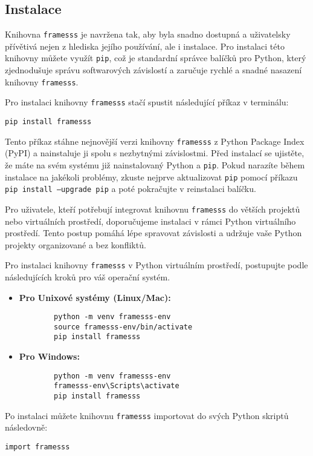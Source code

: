 \subsection{Instalace} \label{sec:framesss_instalation}

Knihovna \texttt{framesss} je navržena tak, aby byla snadno dostupná a uživatelsky přívětivá nejen z hlediska jejího používání, ale i instalace. Pro instalaci této knihovny můžete využít \texttt{pip}, což je standardní správce balíčků pro Python, který zjednodušuje správu softwarových závislostí a zaručuje rychlé a snadné nasazení knihovny \texttt{framesss}.

Pro instalaci knihovny \texttt{framesss} stačí spustit následující příkaz v terminálu:

\begin{verbatim}
pip install framesss
\end{verbatim}

Tento příkaz stáhne nejnovější verzi knihovny \texttt{framesss} z Python Package Index (PyPI) a nainstaluje ji spolu s nezbytnými závislostmi. Před instalací se ujistěte, že máte na svém systému již nainstalovaný Python a \texttt{pip}. Pokud narazíte během instalace na jakékoli problémy, zkuste nejprve aktualizovat \texttt{pip} pomocí příkazu \texttt{pip install --upgrade pip} a poté pokračujte v reinstalaci balíčku.

Pro uživatele, kteří potřebují integrovat knihovnu \texttt{framesss} do větších projektů nebo virtuálních prostředí, doporučujeme instalaci v rámci Python virtuálního prostředí. Tento postup pomáhá lépe spravovat závislosti a udržuje vaše Python projekty organizované a bez konfliktů.

Pro instalaci knihovny \texttt{framesss} v Python virtuálním prostředí, postupujte podle následujících kroků pro váš operační systém.


\begin{itemize}
    \item \textbf{Pro Unixové systémy (Linux/Mac):}
        \begin{verbatim}
        python -m venv framesss-env
        source framesss-env/bin/activate
        pip install framesss
        \end{verbatim}
    
    \item \textbf{Pro Windows:}
        \begin{verbatim}
        python -m venv framesss-env
        framesss-env\Scripts\activate
        pip install framesss
        \end{verbatim}
\end{itemize}

Po instalaci můžete knihovnu \texttt{framesss} importovat do svých Python skriptů následovně:

\begin{verbatim}
import framesss
\end{verbatim}

